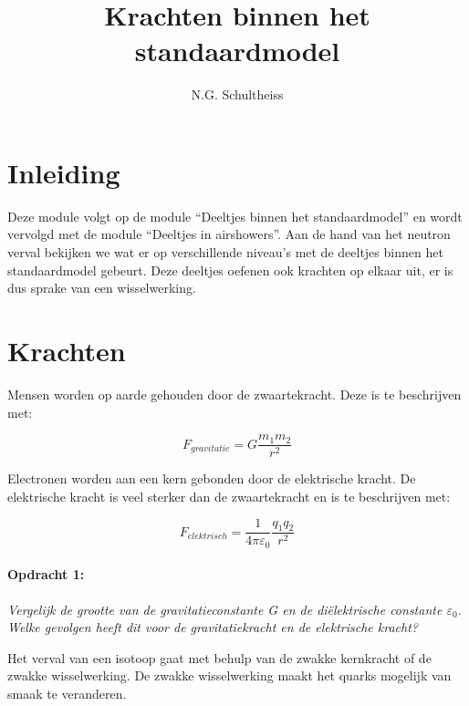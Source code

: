 



\title{Krachten binnen het standaardmodel}
\author{N.G. Schultheiss}
\date{}

\maketitle
\thispagestyle{firststyle}

\section{Inleiding}

Deze module volgt op de module ``Deeltjes binnen het standaardmodel''
en wordt vervolgd met de module ``Deeltjes in airshowers''. Aan
de hand van het neutron verval bekijken we wat er op verschillende
niveau's met de deeltjes binnen het standaardmodel gebeurt. Deze deeltjes
oefenen ook krachten op elkaar uit, er is dus sprake van een wisselwerking.


\section{Krachten}

Mensen worden op aarde gehouden door de zwaartekracht. Deze is te
beschrijven met:

\begin{equation}
F_{gravitatie}=G\frac{m_{1}m_{2}}{r^{2}}
\end{equation}


Electronen worden aan een kern gebonden door de elektrische kracht.
De elektrische kracht is veel sterker dan de zwaartekracht en is te
beschrijven met:

\begin{equation}
F_{elektrisch}=\frac{1}{4\pi\varepsilon_{0}}\frac{q_{1}q_{2}}{r^{2}}
\end{equation}


\paragraph*{Opdracht 1:}

\emph{Vergelijk de grootte van de gravitatieconstante G en de diëlektrische
constante $\varepsilon_{0}$. Welke gevolgen heeft dit voor de gravitatiekracht
en de elektrische kracht?}

Het verval van een isotoop gaat met behulp van de zwakke kernkracht
of de zwakke wisselwerking. De zwakke wisselwerking maakt het quarks
mogelijk van smaak te veranderen.

